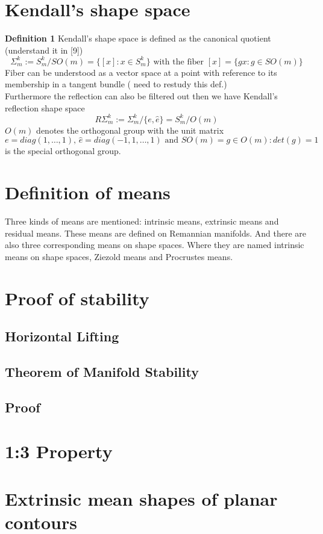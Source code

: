 \documentclass[12pt]{article}
\theoremstyle{definition}
\theoremstyle{remark}
\numberwithin{equation}{section}
\begin{document}
\section{Kendall's shape space}
\textbf{Definition 1}
Kendall's shape space is defined as the canonical quotient (understand it in [9])
\[\Sigma_m^k := S_m^k / SO(m) = \{[x]:x\in S_m^k\} \text{ with the fiber } [x] = \{gx : g \in SO(m)\}\]
Fiber can be understood as a vector space at a point with reference to its membership in a tangent bundle ( need to restudy this def.)\\[0.2cm]
Furthermore the reflection can also be filtered out then we have Kendall's reflection shape space
\[R\Sigma_m^k := \Sigma_m^k / \{e,\hat{e}\} = S_m^k / O(m)\]
$O(m)$ denotes the orthogonal group with the unit matrix $e = diag(1,\dots,1)\text{, } \hat{e} = diag(-1, 1, \dots, 1) \text{ and } SO(m) = {g \in O(m): det(g) = 1}$ is the special orthogonal group.
\section{Definition of means}
Three kinds of means are mentioned: intrinsic means, extrinsic means and residual means. These means are defined on Remannian manifolds. And there are also three corresponding means on shape spaces. Where they are named intrinsic means on shape spaces, Ziezold means and Procrustes means.
\section{Proof of stability}
\subsection*{Horizontal Lifting}
\subsection*{Theorem of Manifold Stability}
\subsection*{Proof}
\section{1:3 Property}
\section{Extrinsic mean shapes of planar contours}
\end{document}
